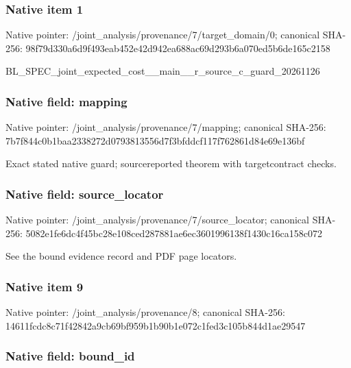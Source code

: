 \documentclass[10pt,a4paper]{article}
\begin{document}
\subsubsection{Native item 1}


Native pointer: /joint\_analysis/provenan\allowbreak{}ce/7/target\_domain/0; canonical SHA-256: 98f79d330a6d9f493eab452e\allowbreak{}42d942ea688ac69d293b6a07\allowbreak{}0ed5b6de165c2158


BL\_SPEC\_joint\_expected\_c\allowbreak{}ost\_\_main\_\_r\_source\_c\_gu\allowbreak{}ard\_20261126


\subsubsection{Native field: mapping}


Native pointer: /joint\_analysis/provenance/7/mapping; canonical SHA-256: 7b7f844c0b1baa2338272d07\allowbreak{}93813556d7f3bfddcf117f76\allowbreak{}2861d84e69e136bf


Exact stated native guard; sourcereported theorem with targetcontract checks.


\subsubsection{Native field: source\_locator}


Native pointer: /joint\_analysis/provenan\allowbreak{}ce/7/source\_locator; canonical SHA-256: 5082e1fe6dc4f45bc28e108c\allowbreak{}ed287881ae6ec3601996138f\allowbreak{}1430c16ca158c072


See the bound evidence record and PDF page locators.


\subsubsection{Native item 9}


Native pointer: /joint\_analysis/provenance/8; canonical SHA-256: 14611fcdc8c71f42842a9cb6\allowbreak{}9bf959b1b90b1e072c1fed3c\allowbreak{}105b844d1ae29547



\subsubsection{Native field: bound\_id}
\end{document}
